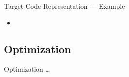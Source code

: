 \begin{frame}{Target Code Representation --- Example}
    \begin{itemize}
        \item 
    \end{itemize}
\end{frame}

\subsection{Optimization}
\begin{frame}{Optimization}
    \dots
\end{frame}
